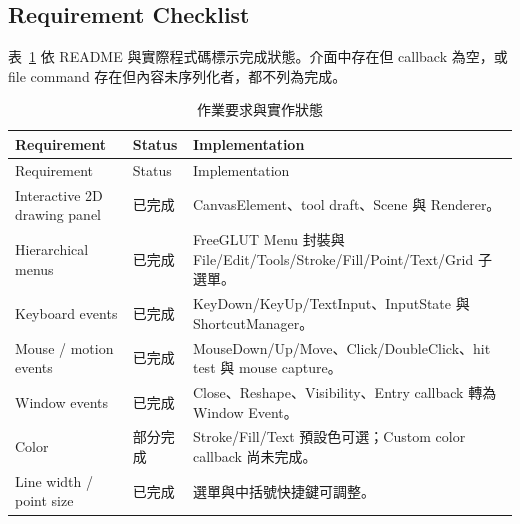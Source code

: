 \subsection{Requirement Checklist}

表~\ref{tab:requirements} 依 README 與實際程式碼標示完成狀態。介面中存在但 callback 為空，或 file command 存在但內容未序列化者，都不列為完成。

\begin{longtable}{>{\raggedright\arraybackslash}p{} >{\raggedright\arraybackslash}p{} >{\raggedright\arraybackslash}p{}}
    \caption{作業要求與實作狀態}\label{tab:requirements}                                                                                              \\
    \toprule
    Requirement                            & Status & Implementation                                                                         \\
    \midrule
    \endfirsthead
    \toprule
    Requirement                            & Status & Implementation                                                                         \\
    \midrule
    \endhead
    Interactive 2D drawing panel           & 已完成    & CanvasElement、tool draft、Scene 與 Renderer。                                             \\
    Hierarchical menus                     & 已完成    & FreeGLUT Menu 封裝與 File/Edit/Tools/Stroke/Fill/Point/Text/Grid 子選單。                     \\
    Keyboard events                        & 已完成    & KeyDown/KeyUp/TextInput、InputState 與 ShortcutManager。                                  \\
    Mouse / motion events                  & 已完成    & MouseDown/Up/Move、Click/DoubleClick、hit test 與 mouse capture。                          \\
    Window events                          & 已完成    & Close、Reshape、Visibility、Entry callback 轉為 Window Event。                               \\
    Color                                  & 部分完成   & Stroke/Fill/Text 預設色可選；Custom color callback 尚未完成。                                     \\
    Line width / point size                & 已完成    & 選單與中括號快捷鍵可調整。                                                                          \\

\end{longtable}
